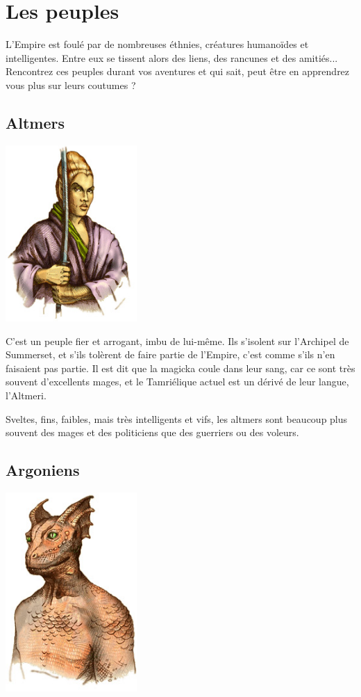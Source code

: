 \chapter{Les peuples}

L'Empire est foulé par de nombreuses éthnies, créatures humanoïdes et intelligentes. Entre eux se tissent alors des liens, des rancunes et des amitiés... Rencontrez ces peuples durant vos aventures et qui sait, peut être en apprendrez vous plus sur leurs coutumes ?

  \section{Altmers}
  
  \begin{center}
  \includegraphics[width=5cm]{images/race_altmer.jpg}
  \end{center}
  
  C'est un peuple fier et arrogant, imbu de lui-même. Ils s'isolent sur l'Archipel de Summerset, et s'ils tolèrent de faire partie de l'Empire, c'est comme s'ils n'en faisaient pas partie. Il est dit que la magicka coule dans leur sang, car ce sont très souvent d'excellents mages, et le Tamriélique actuel est un dérivé de leur langue, l'Altmeri.
  
  Sveltes, fins, faibles, mais très intelligents et vifs, les altmers sont beaucoup plus souvent des mages et des politiciens que des guerriers ou des voleurs.

  \section{Argoniens}
  
  \begin{center}
  \includegraphics[width=5cm]{images/race_argonien.jpg}
  \end{center}
  
